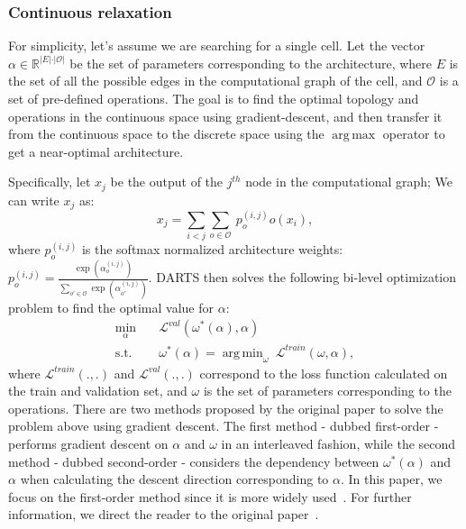 \documentclass{article} \usepackage{fancyhdr, iclr2023_conference, times}
\DeclareMathOperator*{\argmax}{arg\,max}
\DeclareMathOperator*{\argmin}{arg\,min}
\begin{document}
\subsubsection{Continuous relaxation}
\par For simplicity, let's assume we are searching for a single cell. Let the vector $\alpha\in \mathbb{R}^{\vert E\vert \cdot \vert \mathcal{O}\vert}$ be the set of parameters corresponding to the architecture, where $E$ is the set of all the possible edges in the computational graph of the cell, and $\mathcal{O}$ is a set of pre-defined operations. The goal is to find the optimal topology and operations in the continuous space using gradient-descent, and then transfer it from the continuous space to the discrete space using the $\argmax$ operator to get a near-optimal architecture. 
\par Specifically, let $x_j$ be the output of the $j^{th}$ node in the computational graph; We can write $x_j$ as:
\begin{equation}
    x_j=\sum_{i<j}\sum_{o\in \mathcal{O}} ~p_o^{(i, j)}o(x_i),
\end{equation}
where $p_o^{(i, j)}$ is the softmax normalized architecture weights: $p_o^{(i, j)}=\frac{\exp(\alpha_o^{(i, j)})}{\sum_{o'\in \mathcal{O}}\exp(\alpha_{o'}^{(i, j)})}$. DARTS then solves the following bi-level optimization problem to find the optimal value for $\alpha$:
\begin{equation}
    \label{eqn:darts-opt-problem}
    \begin{aligned}
        \min_\alpha \quad & \mathcal{L}^{val} (\omega^*(\alpha), \alpha)
        \\\textrm{s.t.} \quad&\omega^*(\alpha)=\argmin_\omega~\mathcal{L}^{train} (\omega, \alpha),
    \end{aligned}
\end{equation}
where $\mathcal{L}^{train}(., .)$ and $\mathcal{L}^{val}(., .)$ correspond to the loss function calculated on the train and validation set, and $\omega$ is the set of parameters corresponding to the operations. There are two methods proposed by the original paper to solve the problem above using gradient descent. The first method - dubbed first-order - performs gradient descent on $\alpha$ and $\omega$ in an interleaved fashion, while the second method - dubbed second-order - considers the dependency between $\omega^*(\alpha)$ and $\alpha$ when calculating the descent direction corresponding to $\alpha$. In this paper, we focus on the first-order method since it is more widely used~\citep{DBLP:journals/jmlr/ElskenMH19}. For further information, we direct the reader to the original paper~\citep{DBLP:conf/iclr/LiuSY19}.
\end{document}
